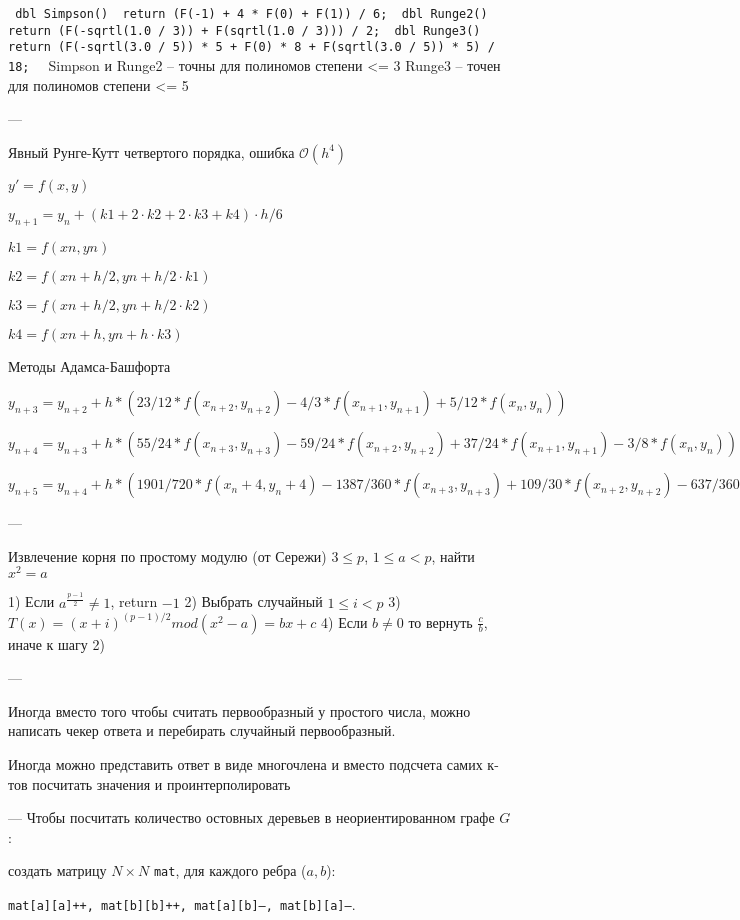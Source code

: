 \texttt{
dbl Simpson() { return (F(-1) + 4 * F(0) + F(1)) / 6; }
dbl Runge2() { return (F(-sqrtl(1.0 / 3)) + F(sqrtl(1.0 / 3))) / 2; }
dbl Runge3() { return (F(-sqrtl(3.0 / 5)) * 5 + F(0) * 8 + F(sqrtl(3.0 / 5)) * 5) / 18; }
}
Simpson и Runge2 -- точны для полиномов степени <= 3
Runge3 -- точен для полиномов степени <= 5

---

Явный Рунге-Кутт четвертого порядка, ошибка $\mathcal{O}(h^4)$

$y' = f(x, y)$

$y_{n+1} = y_n + (k1 + 2 \cdot k2 + 2 \cdot k3 + k4) \cdot h / 6$

$k1 = f(xn, yn)$

$k2 = f(xn + h/2, yn + h/2 \cdot k1)$

$k3 = f(xn + h/2, yn + h/2 \cdot k2)$

$k4 = f(xn + h, yn + h \cdot k3)$

Методы Адамса-Башфорта

$y_{n+3} = y_{n+2} + h * (23/12 * f(x_{n+2},y_{n+2}) - 4/3 * f(x_{n+1},y_{n+1}) + 5/12 * f(x_n,y_n))$

$y_{n+4} = y_{n+3} + h * (55/24 * f(x_{n+3},y_{n+3}) - 59/24 * f(x_{n+2},y_{n+2}) + 37/24 * f(x_{n+1},y_{n+1}) - 3/8 * f(x_n,y_n))$

$y_{n+5} = y_{n+4} + h * (1901/720 * f(x_n+4,y_n+4) - 1387/360 * f(x_{n+3},y_{n+3})
    + 109/30 * f(x_{n+2},y_{n+2}) - 637/360 * f(x_{n+1},y_{n+1}) + 251/720 * f(x_n,y_n))$

---

Извлечение корня по простому модулю (от Сережи)
$3 \leq p$, $1 \leq a < p$, найти $x^2 = a$

1) Если $a^{\frac{p - 1}{2}} \ne 1$, return $-1$
2) Выбрать случайный $1 \leq i < p$
3) $T(x) = (x + i)^{(p - 1)/2} mod (x^2 - a) = bx + c$
4) Если $b \ne 0$ то вернуть $\frac{c}{b}$, иначе к шагу 2)

---

Иногда вместо того чтобы считать первообразный у простого числа,
можно написать чекер ответа и перебирать случайный первообразный.

Иногда можно представить ответ в виде многочлена и вместо подсчета самих к-тов посчитать значения и проинтерполировать

---
Чтобы посчитать количество остовных деревьев в неориентированном графе $G$:

    создать матрицу $N \times N$ \texttt{mat}, для каждого ребра ($a, b$):
    
	\texttt{mat[a][a]++, mat[b][b]++, mat[a][b]--, mat[b][a]--}.
	
